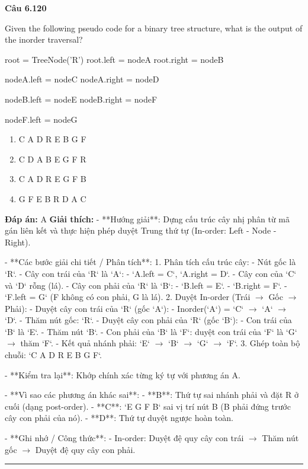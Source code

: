 \documentclass[11pt,a4paper]{article}
\newenvironment{question}[1]{%
  \par\vspace{1em}\noindent\textbf{\large Câu #1}\par\vspace{0.4em}
}{%
  \par\vspace{1em}\hrule\vspace{0.6em}
}
\newenvironment{choices}{%
  \begin{enumerate}[label=\textbf{\Alph*.},leftmargin=2.2em,itemsep=2pt,topsep=3pt]
}{%
  \end{enumerate}
}
\newcommand{\choice}{\item}
\newenvironment{codebox}{%
  \begin{tcolorbox}[colback=gray!8!white,colframe=gray!50!black,arc=1.5mm,boxrule=0.6pt,left=3mm,right=3mm,top=2.5mm,bottom=2.5mm]
  \ttfamily\small
}{%
  \end{tcolorbox}
}
\begin{document}
\begin{question}{6.120}
Given the following pseudo code for a binary tree structure, what is the output of the inorder traversal?
\begin{codebox}
root = TreeNode('R')
root.left = nodeA
root.right = nodeB

nodeA.left = nodeC
nodeA.right = nodeD

nodeB.left = nodeE
nodeB.right = nodeF

nodeF.left = nodeG
\end{codebox}
\begin{choices}
\choice C A D R E B G F
\choice C D A B E G F R
\choice C A D R E G F B
\choice G F E B R D A C
\end{choices}
\textbf{Đáp án:} A
\textbf{Giải thích:} - **Hướng giải**:
  Dựng cấu trúc cây nhị phân từ mã gán liên kết và thực hiện phép duyệt Trung thứ tự (In-order: Left - Node - Right).

- **Các bước giải chi tiết / Phân tích**:
  1. Phân tích cấu trúc cây:
     - Nút gốc là `R`.
     - Cây con trái của `R` là `A`:
       - `A.left = C`, `A.right = D`.
       - Cây con của `C` và `D` rỗng (lá).
     - Cây con phải của `R` là `B`:
       - `B.left = E`.
       - `B.right = F`.
       - `F.left = G` (F không có con phải, G là lá).
  2. Duyệt In-order (Trái \(\rightarrow\) Gốc \(\rightarrow\) Phải):
     - Duyệt cây con trái của `R` (gốc `A`):
       - Inorder(`A`) = `C` \(\rightarrow\) `A` \(\rightarrow\) `D`.
     - Thăm nút gốc: `R`.
     - Duyệt cây con phải của `R` (gốc `B`):
       - Con trái của `B` là `E`.
       - Thăm nút `B`.
       - Con phải của `B` là `F`: duyệt con trái của `F` là `G` \(\rightarrow\) thăm `F`.
       - Kết quả nhánh phải: `E` \(\rightarrow\) `B` \(\rightarrow\) `G` \(\rightarrow\) `F`.
  3. Ghép toàn bộ chuỗi: `C A D R E B G F`.

- **Kiểm tra lại**:
  Khớp chính xác từng ký tự với phương án A.

- **Vì sao các phương án khác sai**:
  - **B**: Thứ tự sai nhánh phải và đặt R ở cuối (dạng post-order).
  - **C**: `E G F B` sai vị trí nút B (B phải đứng trước cây con phải của nó).
  - **D**: Thứ tự duyệt ngược hoàn toàn.

- **Ghi nhớ / Công thức**:
  - In-order: Duyệt đệ quy cây con trái \(\rightarrow\) Thăm nút gốc \(\rightarrow\) Duyệt đệ quy cây con phải.
\end{question}
\end{document}
